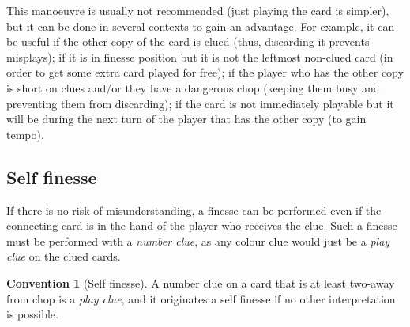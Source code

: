\documentclass[a4paper]{article}
\theoremstyle{plain}
\theoremstyle{definition}
\newtheorem{convention}[theorem]{Convention}
\begin{document}
This manoeuvre is usually not recommended (just playing the card is simpler), but it can be done in several contexts to gain an advantage. For example, it can be useful if the other copy of the card is clued (thus, discarding it prevents misplays); if it is in finesse position but it is not the leftmost non-clued card (in order to get some extra card played for free); if the player who has the other copy is short on clues and/or they have a dangerous chop (keeping them busy and preventing them from discarding); if the card is not immediately playable but it will be during the next turn of the player that has the other copy (to gain tempo).

\subsection{Self finesse}

If there is no risk of misunderstanding, a finesse can be performed even if the connecting card is in the hand of the player who receives the clue. Such a finesse must be performed with a \emph{number clue}, as any colour clue would just be a \emph{play clue} on the clued cards.

\begin{convention}[Self finesse]
	A number clue on a card that is at least two-away from chop is a \emph{play clue}, and it originates a self finesse if no other interpretation is possible.
\end{convention}
\end{document}
